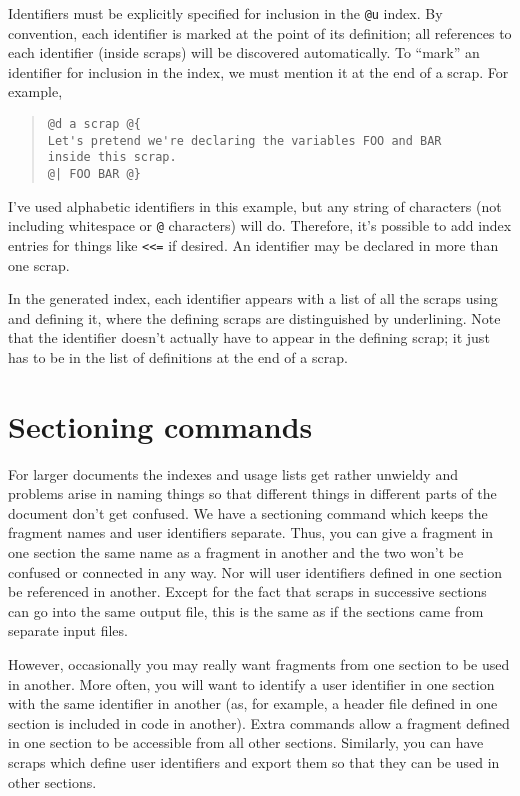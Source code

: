 \documentclass[a4paper]{report}
\begin{document}
Identifiers must be explicitly specified for inclusion in the
\verb|@u| index. By convention, each identifier is marked at the
point of its definition; all references to each identifier (inside
scraps) will be discovered automatically. To ``mark'' an identifier
for inclusion in the index, we must mention it at the end of a scrap.
For example,
\begin{quote}
\begin{verbatim}
@d a scrap @{
Let's pretend we're declaring the variables FOO and BAR
inside this scrap.
@| FOO BAR @}
\end{verbatim}
\end{quote}
I've used alphabetic identifiers in this example, but any string of
characters (not including whitespace or \verb|@| characters) will do.
Therefore, it's possible to add index entries for things like
\verb|<<=| if desired. An identifier may be declared in more than one
scrap.

In the generated index, each identifier appears with a list of all the
scraps using and defining it, where the defining scraps are
distinguished by underlining. Note that the identifier doesn't
actually have to appear in the defining scrap; it just has to be in
the list of definitions at the end of a scrap.

\section{Sectioning commands}
For larger documents the indexes and usage lists get rather
unwieldy and problems arise in naming things so that different
things in different parts of the document don't get confused. We
have a sectioning command which keeps the fragment names and user
identifiers separate. Thus, you can give a fragment in one section
the same name as a fragment in another and the two won't be confused
or connected in any way. Nor will user identifiers
defined in one section be referenced in another. Except for the
fact that scraps in successive sections can go into the same
output file, this is the same as if the sections came from
separate input files.

However, occasionally you may really want fragments from one section
to be used in another. More often, you will want to identify a
user identifier in one section with the same identifier in
another (as, for example, a header file defined in one section is
included in code in another). Extra commands allow a fragment
defined in one section to be accessible from all other sections.
Similarly, you can have scraps which define user identifiers and
export them so that they can be used in other sections.
\end{document}
